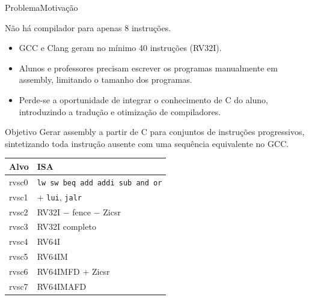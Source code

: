 \documentclass[aspectratio=169]{beamer} %
\begin{document}
\begin{frame}{Problema}{Motivação}
    \vspace{0.5em}
    {\centering\Large\color{PoliBlue}
     Não há compilador para apenas 8 instruções.\par}
    \vspace{1em}
    \begin{itemize}
        \item GCC e Clang geram no mínimo 40 instruções (RV32I).
        \item Alunos e professores precisam escrever os programas manualmente
              em assembly, limitando o tamanho dos programas.
        \item Perde-se a oportunidade de integrar o conhecimento de C do
              aluno, introduzindo a tradução e otimização de compiladores.
    \end{itemize}
\end{frame}

\begin{frame}{Objetivo}
    Gerar assembly a partir de C para conjuntos de instruções
    progressivos, sintetizando toda instrução ausente com uma
    sequência equivalente no GCC.

    \vspace{1em}
    \centering\small
    \begin{tabular}{ll}
        \toprule
        \textbf{Alvo} & \textbf{ISA} \\
        \midrule
        rvsc0 & \texttt{lw sw beq add addi sub and or} \\
        rvsc1 & + \texttt{lui}, \texttt{jalr} \\
        rvsc2 & RV32I $-$ fence $-$ Zicsr \\
        rvsc3 & RV32I completo \\
        rvsc4 & RV64I \\
        rvsc5 & RV64IM \\
        rvsc6 & RV64IMFD + Zicsr \\
        rvsc7 & RV64IMAFD \\
        \bottomrule
    \end{tabular}
\end{frame}
\end{document}
